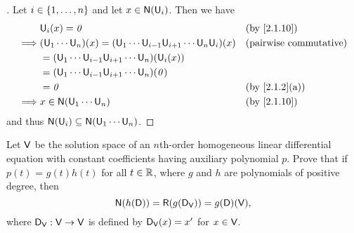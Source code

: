 \begin{proof}[]
  Let \(i \in \left\lbrace1, \dots, n\right\rbrace\) and let \(x \in \ns{\U_i}\).
  Then we have
  \begin{align*}
             & \U_i(x) = \zv                                                                   &  & \text{(by \cref{2.1.10})}     \\
    \implies & (\U_1 \cdots \U_n)(x) = (\U_1 \cdots \U_{i - 1} \U_{i + 1} \cdots \U_n \U_i)(x) &  & \text{(pairwise commutative)} \\
             & = (\U_1 \cdots \U_{i - 1} \U_{i + 1} \cdots \U_n)(\U_i(x))                                                         \\
             & = (\U_1 \cdots \U_{i - 1} \U_{i + 1} \cdots \U_n)(\zv)                                                             \\
             & = \zv                                                                           &  & \text{(by \cref{2.1.2}(a))}   \\
    \implies & x \in \ns{\U_1 \cdots \U_n}                                                     &  & \text{(by \cref{2.1.10})}
  \end{align*}
  and thus \(\ns{\U_i} \subseteq \ns{\U_1 \cdots \U_n}\).
\end{proof}

\setcounter{ex}{11}
\begin{ex}\label{ex:2.7.12}
  Let \(\mathsf{V}\) be the solution space of an \(n\)th-order homogeneous linear differential equation with constant coefficients having auxiliary polynomial \(p\).
  Prove that if \(p(t)\) = \(g(t) h(t)\) for all \(t \in \mathbb{R}\), where \(g\) and \(h\) are polynomials of positive degree, then
  \[
    \ns{h(\Dop)} = \rg{g(\Dop_{\V})} = g(\Dop)(\V),
  \]
  where \(\mathsf{D}_{\mathsf{V}} : \mathsf{V} \to \mathsf{V}\) is defined by \(\mathsf{D}_{\mathsf{V}}(x) = x'\) for \(x \in \mathsf{V}\).
\end{ex}

